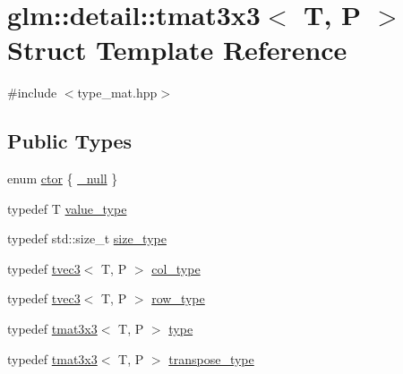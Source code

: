 \hypertarget{structglm_1_1detail_1_1tmat3x3}{}\section{glm\+:\+:detail\+:\+:tmat3x3$<$ T, P $>$ Struct Template Reference}
\label{structglm_1_1detail_1_1tmat3x3}


{\ttfamily \#include $<$type\+\_\+mat.\+hpp$>$}

\subsection*{Public Types}
\begin{DoxyCompactItemize}
\item 
enum \hyperlink{structglm_1_1detail_1_1tmat3x3_a24175afa829b47d3cc2a65860b16e103}{ctor} \{ \hyperlink{structglm_1_1detail_1_1tmat3x3_a24175afa829b47d3cc2a65860b16e103a4b892e336bd2984e872ade90b1464f96}{\+\_\+null}
 \}
\item 
typedef T \hyperlink{structglm_1_1detail_1_1tmat3x3_a42b16ee1a345e9626c90ff078ec056b4}{value\+\_\+type}
\item 
typedef std\+::size\+\_\+t \hyperlink{structglm_1_1detail_1_1tmat3x3_ac2c45ac2aeb10c76e17a54cae3652819}{size\+\_\+type}
\item 
typedef \hyperlink{structglm_1_1detail_1_1tvec3}{tvec3}$<$ T, P $>$ \hyperlink{structglm_1_1detail_1_1tmat3x3_ad47f3a11bd4333d1103bfa93a86fa54f}{col\+\_\+type}
\item 
typedef \hyperlink{structglm_1_1detail_1_1tvec3}{tvec3}$<$ T, P $>$ \hyperlink{structglm_1_1detail_1_1tmat3x3_ad963d0adf30cc0c48a2c4166d8fa93b9}{row\+\_\+type}
\item 
typedef \hyperlink{structglm_1_1detail_1_1tmat3x3}{tmat3x3}$<$ T, P $>$ \hyperlink{structglm_1_1detail_1_1tmat3x3_a8da2644146b18508927325b04c3a9170}{type}
\item 
typedef \hyperlink{structglm_1_1detail_1_1tmat3x3}{tmat3x3}$<$ T, P $>$ \hyperlink{structglm_1_1detail_1_1tmat3x3_a3ecde8b3a849d43a5aefed5f542c041f}{transpose\+\_\+type}
\end{DoxyCompactItemize}
